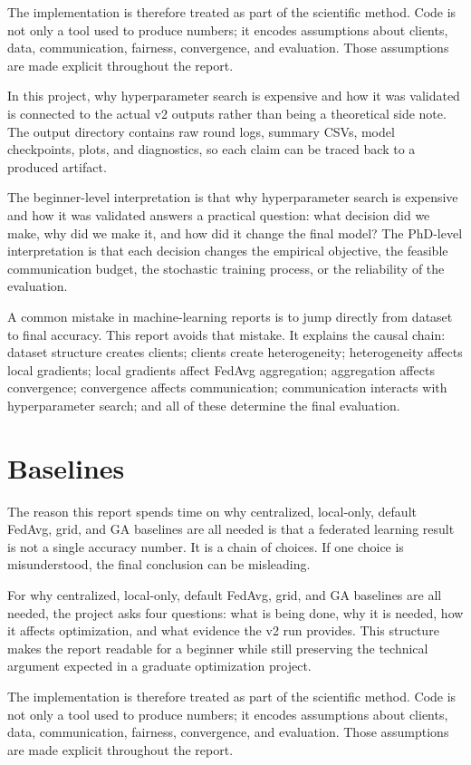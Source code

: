 \documentclass[11pt]{report}
\begin{document}
The implementation is therefore treated as part of the scientific method. Code is not only a tool
used to produce numbers; it encodes assumptions about clients, data, communication, fairness,
convergence, and evaluation. Those assumptions are made explicit throughout the report.

In this project, why hyperparameter search is expensive and how it was validated is connected to the
actual v2 outputs rather than being a theoretical side note. The output directory contains raw round
logs, summary CSVs, model checkpoints, plots, and diagnostics, so each claim can be traced back to a
produced artifact.

The beginner-level interpretation is that why hyperparameter search is expensive and how it was
validated answers a practical question: what decision did we make, why did we make it, and how did
it change the final model? The PhD-level interpretation is that each decision changes the empirical
objective, the feasible communication budget, the stochastic training process, or the reliability of
the evaluation.

A common mistake in machine-learning reports is to jump directly from dataset to final accuracy.
This report avoids that mistake. It explains the causal chain: dataset structure creates clients;
clients create heterogeneity; heterogeneity affects local gradients; local gradients affect FedAvg
aggregation; aggregation affects convergence; convergence affects communication; communication
interacts with hyperparameter search; and all of these determine the final evaluation.

\chapter{Baselines}
The reason this report spends time on why centralized, local-only, default FedAvg, grid, and GA
baselines are all needed is that a federated learning result is not a single accuracy number. It is
a chain of choices. If one choice is misunderstood, the final conclusion can be misleading.

For why centralized, local-only, default FedAvg, grid, and GA baselines are all needed, the project
asks four questions: what is being done, why it is needed, how it affects optimization, and what
evidence the v2 run provides. This structure makes the report readable for a beginner while still
preserving the technical argument expected in a graduate optimization project.

The implementation is therefore treated as part of the scientific method. Code is not only a tool
used to produce numbers; it encodes assumptions about clients, data, communication, fairness,
convergence, and evaluation. Those assumptions are made explicit throughout the report.
\end{document}
